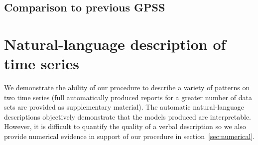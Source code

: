\documentclass{article}
\begin{document}

\subsection{Comparison to previous GPSS}






\section{Natural-language description of time series}
\label{sec:examples}
We demonstrate the ability of our procedure to describe a variety of patterns on two time series (full automatically produced reports for a greater number of data sets are provided as supplementary material).
The automatic natural-language descriptions objectively demonstrate that the models produced are interpretable.
However, it is difficult to quantify the quality of a verbal description so we also provide numerical evidence in support of our procedure in section~\ref{sec:numerical}.
\end{document}

